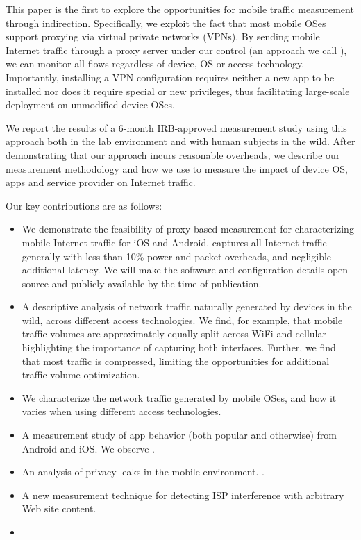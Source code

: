 This paper is the first to explore the opportunities for mobile traffic measurement through indirection. Specifically, 
we exploit the fact that most mobile OSes support proxying via virtual private networks (VPNs). 
By sending mobile Internet traffic through a proxy server under our control (an approach we call \platname), we can monitor all 
flows regardless of device, OS or access technology. Importantly, installing a VPN configuration 
requires neither a new app to be installed nor does it require special or new privileges, thus facilitating 
large-scale deployment on unmodified device OSes.

We report the results of a 6-month IRB-approved measurement study using this approach both in the lab 
environment and with human subjects in the wild. After demonstrating that our approach incurs reasonable 
overheads, we describe our measurement methodology and how we use \platname to measure the 
impact of device OS, apps and service provider on Internet traffic.

Our key contributions are as follows:
\begin{itemize}
\item We demonstrate the feasibility of proxy-based measurement for characterizing mobile Internet traffic for iOS and Android. 
\platname captures all Internet traffic generally with less than 10\% power and packet overheads, and negligible additional 
latency. We will make the \platname software and configuration details open source and publicly available by the time of publication.
\item A descriptive analysis of network traffic naturally generated by devices in the wild, across different access 
technologies. We find, for example, that mobile traffic volumes are approximately equally split across WiFi and cellular -- 
highlighting the importance of capturing both interfaces. Further, we find that most traffic is compressed, limiting the 
opportunities for additional traffic-volume optimization.
\item We characterize the network traffic generated by mobile OSes, and how it varies when using different access technologies.
\item A measurement study of app behavior (both popular and otherwise) from Android and iOS. We observe . 
\item An analysis of privacy leaks in the mobile environment. .
\item A new measurement technique for detecting ISP interference with arbitrary Web site content.
\item {}
\end{itemize}

